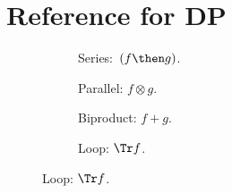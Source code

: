 
\section{Reference for DP}

\begin{figure}[h!]
	\centering
	\begin{subfigure}{0.2\textwidth}
		\centering
		\caption{Series:~$(f \then g)$.}
	\end{subfigure}
	\hspace{10mm} %
	\begin{subfigure}{0.2\textwidth}
		\centering
		\caption{Parallel: $f \otimes g$.}
	\end{subfigure}
	\hspace{10mm} %
	\begin{subfigure}{0.2\textwidth}
		\centering
		\caption{Biproduct: $f + g$.}
	\end{subfigure}
	\hspace{10mm} %
	\begin{subfigure}{0.2\textwidth}
		\centering
		\caption{Loop: $\Tr f$.}
	\end{subfigure}
	\label{fig:diagrams}
\end{figure}

